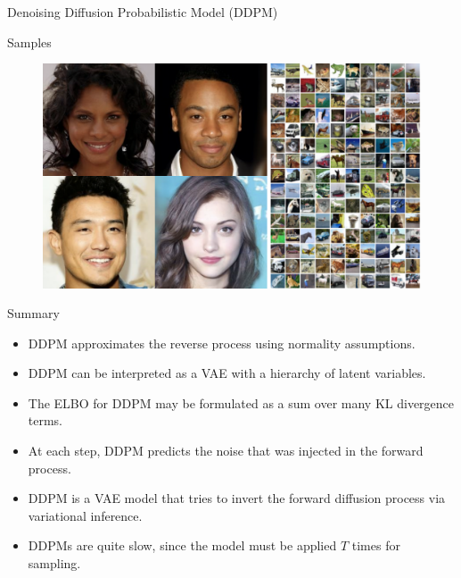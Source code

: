 \documentclass{beamer}
\begin{document}
\begin{frame}{Denoising Diffusion Probabilistic Model (DDPM)}
    \begin{block}{Samples}
        \begin{figure}
            \includegraphics[width=\linewidth]{figs/ddpm_samples}
        \end{figure}
    \end{block}
\end{frame}
\begin{frame}{Summary}
    \begin{itemize}
        \item DDPM approximates the reverse process using normality assumptions.     
        \vfill
        \item DDPM can be interpreted as a VAE with a hierarchy of latent variables.
        \vfill
        \item The ELBO for DDPM may be formulated as a sum over many KL divergence terms.
        \vfill
        \item At each step, DDPM predicts the noise that was injected in the forward process. 
        \vfill
        \item DDPM is a VAE model that tries to invert the forward diffusion process via variational inference. 
        \vfill
        \item DDPMs are quite slow, since the model must be applied $T$ times for sampling.
    \end{itemize}
\end{frame}
\end{document}
